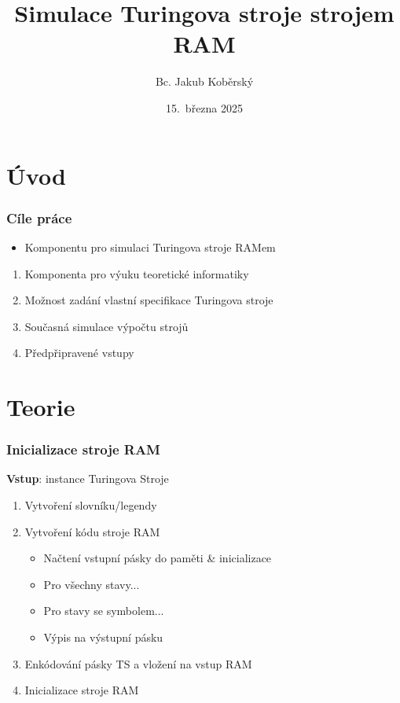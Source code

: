 \documentclass{beamer}
\title[Simulace Turingova stroje strojem RAM]{Simulace Turingova stroje strojem RAM}
\author{Bc. Jakub Koběrský}
\date[15.~3.~2025]{15.~března 2025}
\begin{document}


\section{Úvod}
\begin{frame} 
	\frametitle{Cíle práce}
	\begin{itemize}
		\item<1-> Komponentu pro simulaci Turingova stroje RAMem
	\end{itemize}
    \bigskip
    \begin{enumerate}
        \item<1-> Komponenta pro výuku teoretické informatiky
        \item<1-> Možnost zadání vlastní specifikace Turingova stroje
        \item<1-> Současná simulace výpočtu strojů
        \item<1-> Předpřipravené vstupy
    \end{enumerate}
\end{frame}

\section{Teorie}
\begin{frame} 
	\frametitle{Inicializace stroje RAM}
    \textbf{Vstup}: instance Turingova Stroje
    \begin{enumerate}
        \item Vytvoření slovníku/legendy
        \item Vytvoření kódu stroje RAM
        \begin{itemize}
            \item Načtení vstupní pásky do paměti \& inicializace
            \item Pro všechny stavy... 
            \item Pro stavy se symbolem...
            \item Výpis na výstupní pásku
        \end{itemize}
        \item Enkódování pásky TS a vložení na vstup RAM
        \item Inicializace stroje RAM
    \end{enumerate}
	
\end{frame}
\end{document}
